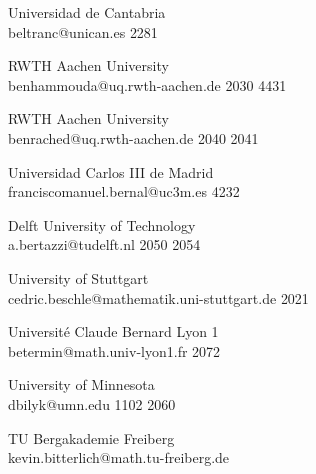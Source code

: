 \begin{multicols}{2}
 {Universidad de Cantabria\\}%
 {beltranc@unican.es}%
 {2281} %
 {} %
 {} %
 {} %
 {} %

 {RWTH Aachen University\\}%
 {benhammouda@uq.rwth-aachen.de}%
 {2030} %
 {4431} %
 {} %
 {} %
 {} %

 {RWTH Aachen University\\}%
 {benrached@uq.rwth-aachen.de}%
 {2040} %
 {2041} %
 {} %
 {} %
 {} %

 {Universidad Carlos III de Madrid\\}%
 {franciscomanuel.bernal@uc3m.es}%
 {4232} %
 {} %
 {} %
 {} %
 {} %

 {Delft University of Technology\\}%
 {a.bertazzi@tudelft.nl}%
 {2050} %
 {2054} %
 {} %
 {} %
 {} %

 {University of Stuttgart\\}%
 {cedric.beschle@mathematik.uni-stuttgart.de}%
 {2021} %
 {} %
 {} %
 {} %
 {} %

 {Universit\'e Claude Bernard Lyon 1\\}%
 {betermin@math.univ-lyon1.fr}%
 {2072} %
 {} %
 {} %
 {} %
 {} %


 {University of Minnesota\\}%
 {dbilyk@umn.edu}%
 {1102} %
 {2060} %
 {} %
 {} %
 {} %


 {TU Bergakademie Freiberg\\}%
 {kevin.bitterlich@math.tu-freiberg.de}%
 {} %
 {} %
 {} %
 {} %
 {} %


\end{multicols}
